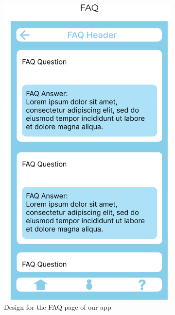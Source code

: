 \begin{figure}
	\centering
	\begin{subfigure}[T]{0.4\linewidth}
		\includegraphics[width=\linewidth]{figures/FAQ.png}
		\caption{Design for the FAQ page of our app}
		\label{fig:FAQ}
	\end{subfigure}
	\hfill
	\begin{subfigure}[T]{0.4\linewidth}

\end{subfigure}
\end{figure}

